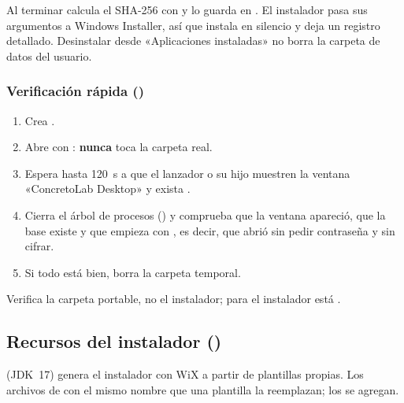 Al terminar calcula el SHA-256 con  y lo guarda en . El
instalador  pasa sus argumentos a Windows Installer, así que  instala en silencio y
 deja un registro detallado. Desinstalar desde «Aplicaciones instaladas» no borra la carpeta de
datos del usuario.

\subsubsection{Verificación rápida ()}
\label{sec:dis-verificar}

\begin{enumerate}
	\item Crea .
	\item Abre  con
	      : \textbf{nunca} toca la carpeta real.
	\item Espera hasta 120~s a que el lanzador o su hijo muestren la ventana «ConcretoLab Desktop» y exista
	      .
	\item Cierra el árbol de procesos () y comprueba que la ventana apareció, que la base existe y
	      que empieza con , es decir, que abrió sin pedir contraseña y sin cifrar.
	\item Si todo está bien, borra la carpeta temporal.
\end{enumerate}

Verifica la carpeta portable, no el instalador; para el instalador está .

\subsection{Recursos del instalador ()}

 (JDK~17) genera el instalador con WiX a partir de plantillas propias. Los archivos de
 con el mismo nombre que una plantilla la reemplazan; los  se agregan.

